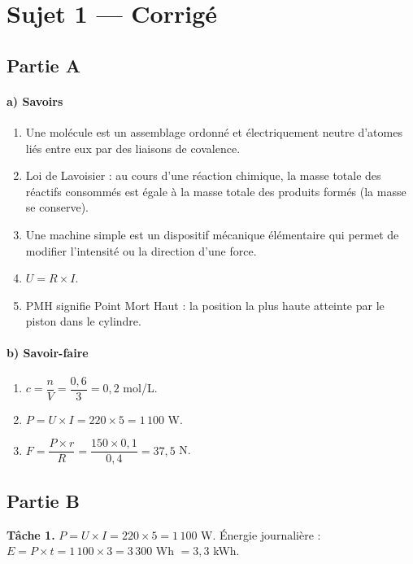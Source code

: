 \section{Sujet 1 — Corrigé}

\subsection*{Partie A}

\paragraph{a) Savoirs}
\begin{enumerate}[label=\arabic*)]
\item Une molécule est un assemblage ordonné et électriquement neutre d'atomes liés entre
eux par des liaisons de covalence.
\item Loi de Lavoisier : au cours d'une réaction chimique, la masse totale des réactifs
consommés est égale à la masse totale des produits formés (la masse se conserve).
\item Une machine simple est un dispositif mécanique élémentaire qui permet de modifier
l'intensité ou la direction d'une force.
\item $U=R\times I$.
\item PMH signifie Point Mort Haut : la position la plus haute atteinte par le piston dans
le cylindre.
\end{enumerate}

\paragraph{b) Savoir-faire}
\begin{enumerate}[label=\arabic*)]
\item $c=\dfrac nV=\dfrac{0{,}6}3=0{,}2$ mol/L.
\item $P=U\times I=220\times5=1\,100$ W.
\item $F=\dfrac{P\times r}{R}=\dfrac{150\times0{,}1}{0{,}4}=37{,}5$ N.
\end{enumerate}

\subsection*{Partie B}

\textbf{Tâche 1.} $P=U\times I=220\times5=1\,100$ W. Énergie journalière :
$E=P\times t=1\,100\times3=3\,300$ Wh $=3{,}3$ kWh.

